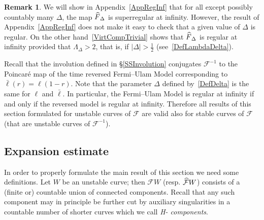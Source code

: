 \documentclass[10pt]{amsart}
\theoremstyle{definition}\newtheorem{defi}[theo]{Definition}\newtheorem{rema}[theo]{Remark}\newtheorem{exam}[theo]{Example}\newtheorem{exem}[theo]{Example}\newtheorem{nota}[theo]{Notation}
\newcommand{\inv}{^{-1}}
\newcommand{\cm}{\mathcal{F}}
\newcommand{\cmp}{\hat\cm}
\newcommand{\Hcomps}{H-\hskip0pt components}
\newcommand{\nf}{\hat F}
\let\oldhat\hat
\renewcommand*{\hat}[1]{\mathchoice{\widehat{#1}}{\widehat{#1}}{\oldhat{#1}}{\oldhat{#1}}}
\begin{document}
\begin{rema}\label{RkDeltaHalf}
We will show in Appendix~\ref{AppRegInf} that for all except possibly countably many $\Delta$, the map $\nf_\Delta$ is superregular at infinity. However, the result of Appendix~\ref{AppRegInf} does not make it easy to check that a given value of $\Delta$ is regular. On the other hand~\eqref{VirtCompTrivial} shows that $\nf_\Delta$ is regular at infinity provided that $\Lambda_\Delta>2$, that is, if $|\Delta|>\frac{1}{2}$ (see~\eqref{DefLambdaDelta}).
\end{rema}

Recall that the involution defined in \S\ref{SSInvolution} conjugates $\cm^{-1}$ to the Poincaré map of the time reversed Fermi--Ulam Model corresponding to $\bar{\ell}(r)=\ell(1-r)$. Note that the parameter $\Delta$ defined by~\eqref{DefDelta} is the same for $\ell$ and $\bar{\ell}$. In particular, the Fermi--Ulam Model is regular at infinity if and only if the reversed model is regular at infinity. Therefore all results of this section formulated for unstable curves of $\cm$ are valid also for stable curves of $\cm$ (that are unstable curves of $\cm\inv$).


\subsection{Expansion estimate}\label{SSEe}
In order to properly formulate the main result of this section we need some definitions. Let $W$ be an unstable curve; then $\cm W$ (resp. $\cmp W$) consists of a (finite or) countable union of connected components. Recall that any such component may in principle be further cut by auxiliary singularities in a countable number of shorter curves which we call \emph{\Hcomps{}}.
\end{document}

